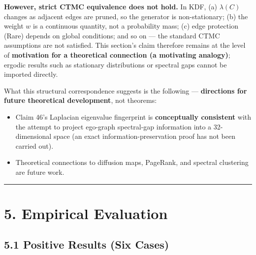 \textbf{However, strict CTMC equivalence does not hold.} In KDF, (a) \(\lambda(C)\) changes as adjacent edges are pruned, so the generator is non-stationary; (b) the weight \(w\) is a continuous quantity, not a probability mass; (c) edge protection (Rare) depends on global conditions; and so on --- the standard CTMC assumptions are not satisfied. This section's claim therefore remains at the level of \textbf{motivation for a theoretical connection (a motivating analogy)}; ergodic results such as stationary distributions or spectral gaps cannot be imported directly.

What this structural correspondence suggests is the following --- \textbf{directions for future theoretical development}, not theorems:

\begin{itemize}
\tightlist
\item
  Claim 46's Laplacian eigenvalue fingerprint is \textbf{conceptually consistent} with the attempt to project ego-graph spectral-gap information into a 32-dimensional space (an exact information-preservation proof has not been carried out).
\item
  Theoretical connections to diffusion maps, PageRank, and spectral clustering are future work.
\end{itemize}

\begin{center}\rule{0.5\linewidth}{0.5pt}\end{center}

\section{5. Empirical Evaluation}\label{empirical-evaluation}

\subsection{5.1 Positive Results (Six Cases)}\label{positive-results-six-cases}


